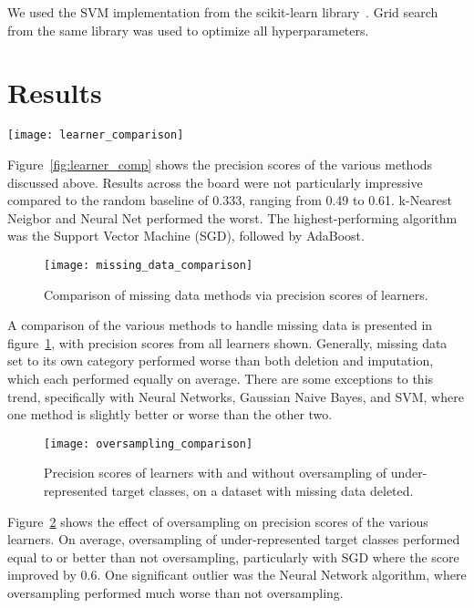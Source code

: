 \documentclass[conference]{IEEEtran}
\begin{document}
We used the SVM implementation from the scikit-learn library~\cite{scikit-learn}. Grid search from the same library was used to optimize all hyperparameters.

\section{Results}

\begin{figure*}[htpb]
	\centering
	\texttt{[image: learner\_comparison]}
	\caption{Comparison of precision scores of learners on dataset with missing data deleted and no oversampling performed.}
	\label{fig:learner_comp}
\end{figure*}

Figure~\ref{fig:learner_comp} shows the precision scores of the various methods discussed above. Results across the board were not particularly impressive compared to the random baseline of 0.333, ranging from 0.49 to 0.61. k-Nearest Neigbor and Neural Net performed the worst. The highest-performing algorithm was the Support Vector Machine (SGD), followed by AdaBoost.

\begin{figure}[htpb]
	\centering
	\texttt{[image: missing\_data\_comparison]}
	\caption{Comparison of missing data methods via precision scores of learners.}
	\label{fig:missing_data_comp}
\end{figure}

A comparison of the various methods to handle missing data is presented in figure~\ref{fig:missing_data_comp}, with precision scores from all learners shown. Generally, missing data set to its own category performed worse than both deletion and imputation, which each performed equally on average. There are some exceptions to this trend, specifically with Neural Networks, Gaussian Naive Bayes, and SVM, where one method is slightly better or worse than the other two.

\begin{figure}[htpb]
	\centering
	\texttt{[image: oversampling\_comparison]}
	\caption{Precision scores of learners with and without oversampling of under-represented target classes, on a dataset with missing data deleted.}
	\label{fig:oversampling_comp}
\end{figure}

Figure~\ref{fig:oversampling_comp} shows the effect of oversampling on precision scores of the various learners. On average, oversampling of under-represented target classes performed equal to or better than not oversampling, particularly with SGD where the score improved by 0.6. One significant outlier was the Neural Network algorithm, where oversampling performed much worse than not oversampling.
\end{document}
